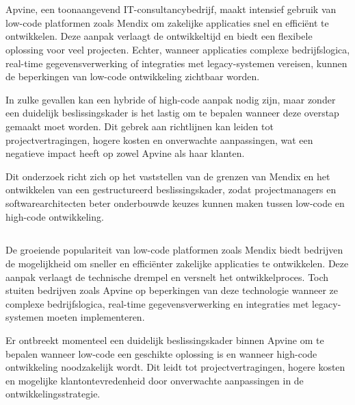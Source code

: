 
\chapter{}%
\label{ch:inleiding}

Apvine, een toonaangevend IT-consultancybedrijf, maakt intensief gebruik van low-code platformen zoals Mendix om zakelijke applicaties snel en efficiënt te ontwikkelen. Deze aanpak verlaagt de ontwikkeltijd en biedt een flexibele oplossing voor veel projecten. Echter, wanneer applicaties complexe bedrijfslogica, real-time gegevensverwerking of integraties met legacy-systemen vereisen, kunnen de beperkingen van low-code ontwikkeling zichtbaar worden.

In zulke gevallen kan een hybride of high-code aanpak nodig zijn, maar zonder een duidelijk beslissingskader is het lastig om te bepalen wanneer deze overstap gemaakt moet worden. Dit gebrek aan richtlijnen kan leiden tot projectvertragingen, hogere kosten en onverwachte aanpassingen, wat een negatieve impact heeft op zowel Apvine als haar klanten.

Dit onderzoek richt zich op het vaststellen van de grenzen van Mendix en het ontwikkelen van een gestructureerd beslissingskader, zodat projectmanagers en softwarearchitecten beter onderbouwde keuzes kunnen maken tussen low-code en high-code ontwikkeling.


\section{}%
\label{sec:probleemstelling}

De groeiende populariteit van low-code platformen zoals Mendix biedt bedrijven de mogelijkheid om sneller en efficiënter zakelijke applicaties te ontwikkelen. Deze aanpak verlaagt de technische drempel en versnelt het ontwikkelproces. Toch stuiten bedrijven zoals Apvine op beperkingen van deze technologie wanneer ze complexe bedrijfslogica, real-time gegevensverwerking en integraties met legacy-systemen moeten implementeren.

Er ontbreekt momenteel een duidelijk beslissingskader binnen Apvine om te bepalen wanneer low-code een geschikte oplossing is en wanneer high-code ontwikkeling noodzakelijk wordt. Dit leidt tot projectvertragingen, hogere kosten en mogelijke klantontevredenheid door onverwachte aanpassingen in de ontwikkelingsstrategie.

